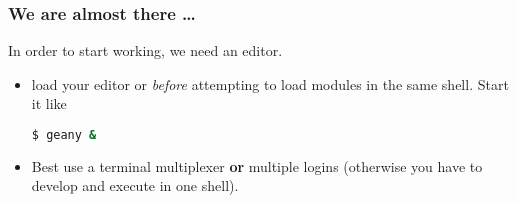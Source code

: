 \begin{frame}[fragile]
  \frametitle{We are almost there \ldots}
  In order to start working, we need an editor.
  \begin{itemize}[<+->]
   \item load your editor  or  \emph{before} attempting to load modules in the same shell. Start it like
         \begin{lstlisting}[language=Bash, style=Shell]
$ geany & 
         \end{lstlisting}
   \item Best use a terminal multiplexer \textbf{or} multiple logins (otherwise you have to develop and execute in one shell).
  \end{itemize}
\end{frame}



